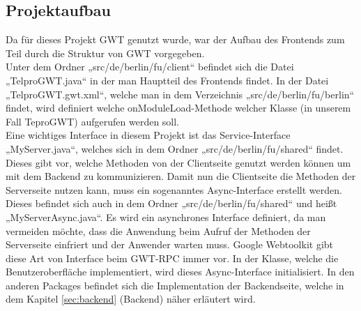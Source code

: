 \documentclass[12pt,a4paper,twoside]{article}
\begin{document}
\subsection{Projektaufbau}
\label{ssec:aufbau}
Da für dieses Projekt GWT genutzt wurde, war der Aufbau des Frontends zum Teil durch die Struktur von GWT vorgegeben. \\
Unter dem Ordner „src/de/berlin/fu/client“ befindet sich die Datei „TelproGWT.java“ in der man Hauptteil des Frontends findet. In der Datei „TelproGWT.gwt.xml“, welche man in dem Verzeichnis „src/de/berlin/fu/berlin“ findet, wird definiert welche onModuleLoad-Methode welcher Klasse (in unserem Fall TeproGWT) aufgerufen werden soll. \\
Eine wichtiges Interface in diesem Projekt ist das Service-Interface „MyServer.java“, welches sich in dem Ordner „src/de/berlin/fu/shared“ findet. Dieses gibt vor, welche Methoden von der Clientseite genutzt werden können um mit dem Backend zu kommunizieren. Damit nun die Clientseite die Methoden der Serverseite nutzen kann, muss ein sogenanntes Async-Interface erstellt werden. Dieses befindet sich auch in dem Ordner „src/de/berlin/fu/shared“ und heißt „MyServerAsync.java“. Es wird ein asynchrones Interface definiert, da man vermeiden möchte, dass die Anwendung beim Aufruf der Methoden der Serverseite einfriert und der Anwender warten muss. Google Webtoolkit gibt diese Art von Interface beim GWT-RPC immer vor. In der Klasse, welche die Benutzeroberfläche implementiert, wird dieses Async-Interface initialisiert. 
In den anderen Packages befindet sich die Implementation der Backendseite, welche in dem Kapitel \ref{sec:backend} (Backend) näher erläutert wird.
\end{document}
